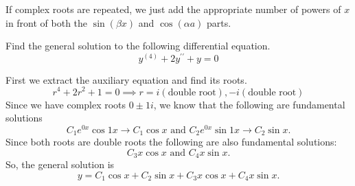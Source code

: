 \noindent
If complex roots are repeated, we just add the appropriate number of powers of $x$ in front of both the $\sin{(\beta x)}$ and $\cos{(\alpha a)}$ parts.
\pagebreak %

\begin{example}
	Find the general solution to the following differential equation.
	\begin{equation*}
		y^{(4)} + 2y^{\prime\prime} + y = 0
	\end{equation*}
\end{example}
\noindent
First we extract the auxiliary equation and find its roots.
\begin{equation*}
	r^4 + 2r^2 + 1 = 0 \implies r = i (\text{double root}), -i (\text{double root})
\end{equation*}
Since we have complex roots $0 \pm 1i$, we know that the following are fundamental solutions
\begin{equation*}
	C_1e^{0x}\cos{1x} \to C_1\cos{x} \text{ and } C_2e^{0x}\sin{1x} \to C_2\sin{x}.
\end{equation*}
Since both roots are double roots the following are also fundamental solutions:
\begin{equation*}
	C_3x\cos{x} \text{ and } C_4x\sin{x}.
\end{equation*}
So, the general solution is
\begin{equation*}
	y = C_1\cos{x} + C_2\sin{x} + C_3x\cos{x} + C_4x\sin{x}.
\end{equation*}